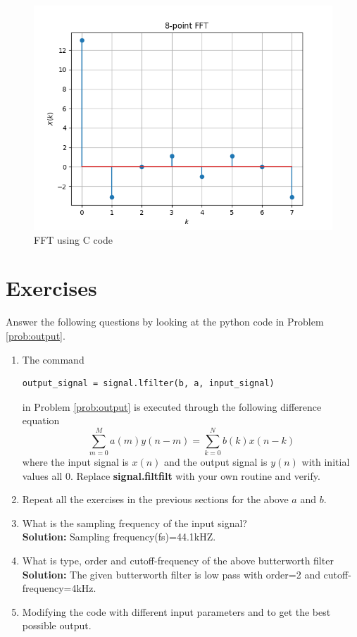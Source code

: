 \documentclass[journal,12pt,twocolumn]{IEEEtran}
\newcommand{\solution}{\noindent \textbf{Solution: }}
\providecommand{\brak}[1]{\ensuremath{\left(#1\right)}}
\numberwithin{equation}{section}
\renewcommand\thesection{\arabic{section}}
\begin{document}
\begin{enumerate}[label=\arabic*.,ref=\thesection.\theenumi]
\begin{figure}[!ht]
	\includegraphics[width = \columnwidth]{figs/X_k_8point.png}
	\centering
	\caption{FFT using C code}
	\label{DFT_fft}
\end{figure}
 \end{enumerate}
\section{Exercises}
Answer the following questions by looking at the python code in Problem \ref{prob:output}.
\begin{enumerate}[label=\thesection.\arabic*]
\item
The command
\begin{lstlisting}
output_signal = signal.lfilter(b, a, input_signal)
	\end{lstlisting}
in Problem \ref{prob:output} is executed through the following difference equation
\begin{equation}
\label{eq:iir_filter_gen}
 \sum _{m=0}^{M}a\brak{m}y\brak{n-m}=\sum _{k=0}^{N}b\brak{k}x\brak{n-k}
\end{equation}
%
where the input signal is $x(n)$ and the output signal is $y(n)$ with initial values all 0. Replace
\textbf{signal.filtfilt} with your own routine and verify.
%
\item Repeat all the exercises in the previous sections for the above $a$ and $b$.
\item What is the sampling frequency of the input signal?
\\
\solution
Sampling frequency(fs)=44.1kHZ.
\item
What is type, order and  cutoff-frequency of the above butterworth filter
\\
\solution
The given butterworth filter is low pass with order=2 and cutoff-frequency=4kHz.
%
\item
Modifying the code with different input parameters and to get the best possible output.
%
\end{enumerate}
\end{document}
